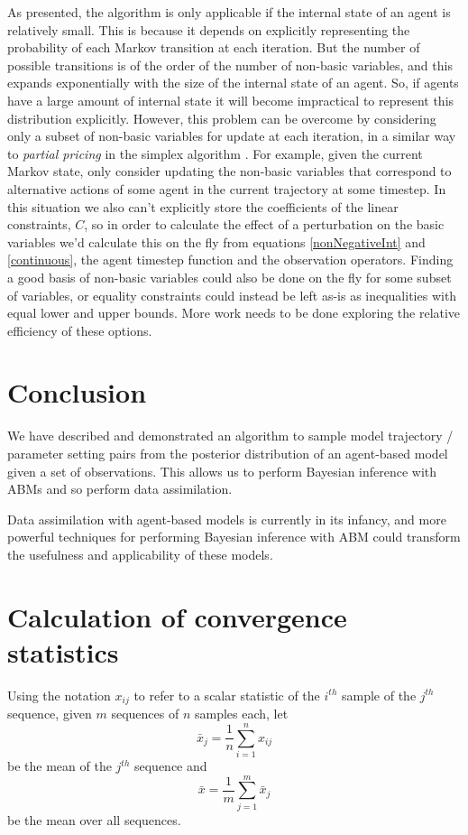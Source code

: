 \documentclass{article}
\begin{document}
As presented, the algorithm is only applicable if the internal state of an agent is relatively small. This is because it depends on explicitly representing the probability of each Markov transition at each iteration. But the number of possible transitions is of the order of the number of non-basic variables, and this expands exponentially with the size of the internal state of an agent. So, if agents have a large amount of internal state it will become impractical to represent this distribution explicitly. However, this problem can be overcome by considering only a subset of non-basic variables for update at each iteration, in a similar way to \textit{partial pricing} in the simplex algorithm \citep{maros2002computational}. For example, given the current Markov state, only consider updating the non-basic variables that correspond to alternative actions of some agent in the current trajectory at some timestep. In this situation we also can't explicitly store the coefficients of the linear constraints, $C$, so in order to calculate the effect of a perturbation on the basic variables we'd calculate this on the fly from equations \eqref{nonNegativeInt} and \eqref{continuous}, the agent timestep function and the observation operators. Finding a good basis of non-basic variables could also be done on the fly for some subset of variables, or equality constraints could instead be left as-is as inequalities with equal lower and upper bounds. More work needs to be done exploring the relative efficiency of these options.

\section{Conclusion}

We have described and demonstrated an algorithm to sample model trajectory / parameter setting pairs from the posterior distribution of an agent-based model given a set of observations. This allows us to  perform Bayesian inference with ABMs and so perform data assimilation.

Data assimilation with agent-based models is currently in its infancy, and more powerful techniques for performing Bayesian inference with ABM could transform the usefulness and applicability of these models.
	
\appendix 

\section{Calculation of convergence statistics}
\label{calculatingConvergenceStats}
Using the notation $x_{ij}$ to refer to a scalar statistic of the $i^{th}$ sample of the $j^{th}$ sequence, given $m$ sequences of $n$ samples each, let
\[
\bar{x}_j = \frac{1}{n}\sum_{i=1}^n x_{ij}
\]
be the mean of the $j^{th}$ sequence and
\[
\bar{x} = \frac{1}{m}\sum_{j=1}^m \bar{x}_j
\]
be the mean over all sequences.
\end{document}

